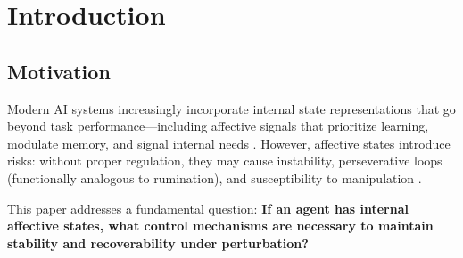 \documentclass{article}
\begin{document}
\begin{abstract}
\begin{enumerate}
    \item In tabular reinforcement learning on \texttt{ChangingGoalGridWorld}, ARC's \textbf{memory-gating component alone} is the strongest single mechanism, reaching 71.8\% success (\textbf{+79.9\%} relative to the 39.9\% baseline); the integrated ARC-RL wrapper that combines memory gating with shift detection reaches 59.8\% (+49.8\% over baseline), indicating that the two mechanisms, while individually beneficial, interact sub-additively when composed --- a finding we discuss as a limitation of the current integration (Section~7.4) rather than as a validation of the full wrapper. Preliminary Deep RL (DQN) experiments are underperforming and indicate that gradient-based learners require architectural redesign---reported explicitly in Appendix~\ref{sec:dqn_suite} as a scope boundary and motivation for future work.
\end{enumerate}

All code and data are available at \url{https://github.com/edamianreynoso/arc-assb-controller} (tag \texttt{arc-paper-v1}); see Appendix~A for the full environment specification (Python version, library floors, hardware profile, canonical seed list) and the commit-hash anchor for this submission.
\end{abstract}


\section{Introduction}

\subsection{Motivation}

Modern AI systems increasingly incorporate internal state representations that go beyond task performance---including affective signals that prioritize learning, modulate memory, and signal internal needs \cite{Damasio1994, Picard1997}. However, affective states introduce risks: without proper regulation, they may cause instability, perseverative loops (functionally analogous to rumination), and susceptibility to manipulation \cite{Amodei2016}.

This paper addresses a fundamental question: \textbf{If an agent has internal affective states, what control mechanisms are necessary to maintain stability and recoverability under perturbation?}
\end{document}
